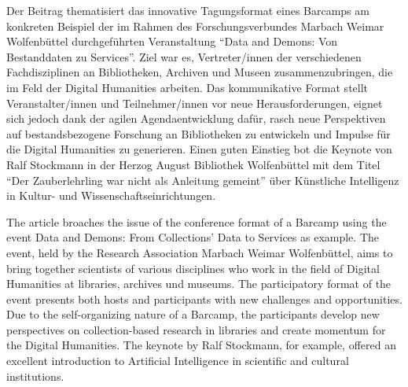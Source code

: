 Der Beitrag thematisiert das innovative Tagungsformat eines Barcamps am
konkreten Beispiel der im Rahmen des Forschungsverbundes Marbach Weimar
Wolfenbüttel durchgeführten Veranstaltung ``Data and Demons: Von
Bestanddaten zu Services''. Ziel war es, Vertreter/innen der
verschiedenen Fachdisziplinen an Bibliotheken, Archiven und Museen
zusammenzubringen, die im Feld der Digital Humanities arbeiten. Das
kommunikative Format stellt Veranstalter/innen und Teilnehmer/innen vor
neue Herausforderungen, eignet sich jedoch dank der agilen
Agendaentwicklung dafür, rasch neue Perspektiven auf bestandsbezogene
Forschung an Bibliotheken zu entwickeln und Impulse für die Digital
Humanities zu generieren. Einen guten Einstieg bot die Keynote von Ralf
Stockmann in der Herzog August Bibliothek Wolfenbüttel mit dem Titel
``Der Zauberlehrling war nicht als Anleitung gemeint'' über Künstliche
Intelligenz in Kultur- und Wissenschaftseinrichtungen.

The article broaches the issue of the conference format of a Barcamp
using the event Data and Demons: From Collections' Data to Services as
example. The event, held by the Research Association Marbach Weimar
Wolfenbüttel, aims to bring together scientists of various disciplines
who work in the field of Digital Humanities at libraries, archives und
museums. The participatory format of the event presents both hosts and
participants with new challenges and opportunities. Due to the
self-organizing nature of a Barcamp, the participants develop new
perspectives on collection-based research in libraries and create
momentum for the Digital Humanities. The keynote by Ralf Stockmann, for
example, offered an excellent introduction to Artificial Intelligence in
scientific and cultural institutions.
